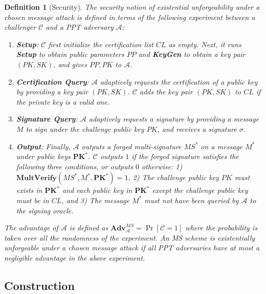 \documentclass[11pt,letterpaper]{article}
\newcommand{\vect}[1]{\mathbf{#1}}
\newtheorem{definition}[theorem]{Definition}
\newcommand{\Adv}{\textbf{Adv}}
\newcommand{\mc}[1]{\mathcal{#1}}
\newcommand{\tb}[1]{\textbf{#1}}
\begin{document}
\begin{definition}[Security]
The security notion of existential unforgeability under a chosen message
attack is defined in terms of the following experiment between a challenger
$\mc{C}$ and a PPT adversary $\mc{A}$:
\begin{enumerate}
\item \tb{Setup}: $\mc{C}$ first initialize the certification list $CL$ as
    empty. Next, it runs \tb{Setup} to obtain public parameters $PP$ and
    \tb{KeyGen} to obtain a key pair $(PK,SK)$, and gives $PP, PK$ to
    $\mc{A}$.

\item \tb{Certification Query}: $\mc{A}$ adaptively requests the
    certification of a public key by providing a key pair $(PK,SK)$.
    $\mc{C}$ adds the key pair $(PK,SK)$ to $CL$ if the private key is a
    valid one.

\item \tb{Signature Query}: $\mc{A}$ adaptively requests a signature by
    providing a message $M$ to sign under the challenge public key $PK$,
    and receives a signature $\sigma$.

\item \tb{Output}: Finally, $\mc{A}$ outputs a forged multi-signature
    $MS^*$ on a message $M^*$ under public keys $\vect{PK}^*$. $\mc{C}$
    outputs $1$ if the forged signature satisfies the following three
    conditions, or outputs $0$ otherwise: 1) $\tb{MultVerify} (MS^*, M^*,
    \vect{PK}^*) = 1$, 2) The challenge public key $PK$ must exists in
    $\vect{PK}^*$ and each public key in $\vect{PK}^*$ except the challenge
    public key must be in $CL$, and 3) The message $M^*$ must not have been
    queried by $\mc{A}$ to the signing oracle.
\end{enumerate}
The advantage of $\mc{A}$ is defined as $\Adv_{\mc{A}}^{MS} = \Pr [\mc{C} =
1]$ where the probability is taken over all the randomness of the experiment.
An MS scheme is existentially unforgeable under a chosen message attack if
all PPT adversaries have at most a negligible advantage in the above
experiment.
\end{definition}

\subsection{Construction}
\end{document}
